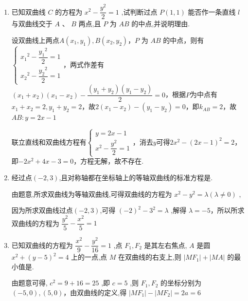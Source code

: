 \begin{enumerate}
\begin{jieda}
        代入具体数值有$100 = 36 - 64 \times (cos\angle {F}_{1}P{F}_{2} - 1)$，故$cos\angle {F}_{1}P{F}_{2} = 0$，即$\angle {F}_{1}P{F}_{2} = \dfrac{\pi}{2}$
    \end{jieda}
    \item 已知双曲线 ${C}$ 的方程为 ${x}^{2} - \dfrac{{y}^{2}}{2} = 1$ ,试判断过点 $P\left( {1,1}\right)$ 能否作一条直线 $l$ 与双曲线交于 $A\text{ 、 }B$ 两点,且 $P$ 为 ${AB}$ 的中点,并说明理由.
    \begin{jieda}
        设双曲线上两点$A(x_1, y_1), B(x_2, y_2)$，$P$ 为 ${AB}$ 的中点，则有$\left\{\begin{array}{l}
             {x_1}^{2} - \dfrac{{y_1}^{2}}{2} = 1  \\
             {x_2}^{2} - \dfrac{{y_2}^{2}}{2} = 1
        \end{array}\right.$，两式作差有$(x_1+x_2)(x_1-x_2) - \dfrac{(y_1+y_2)(y_1-y_2)}{2} = 0$，根据$P$为中点有$x_1+x_2 = 2, y_1+y_2 = 2$，故$2(x_1-x_2) - (y_1-y_2) = 0$，即$k_{AB} = 2$，故$AB: y = 2x-1$

        联立直线和双曲线方程有$\left\{\begin{array}{l}
             y = 2x-1  \\
             {x}^{2} - \dfrac{{y}^{2}}{2} = 1
        \end{array}\right.$，消去$y$可得$2x^2-(2x-1)^2 = 2$，即$-2x^2+4x-3=0$，方程无解，故不存在.
    \end{jieda}
    \item 经过点$(-2,3)$,且对称轴都在坐标轴上的等轴双曲线的标准方程是.
    \begin{jieda}
        由题意,所求双曲线为等轴双曲线,可得双曲线的方程为 ${x}^{2} - {y}^{2} = \lambda \left( {\lambda  \neq  0}\right)$ ,
        
        因为所求双曲线过点$(-2,3)$,可得 ${\left( -2\right) }^{2} - {3}^{2} = \lambda$ ,解得 $\lambda  =  - 5$，所以所求双曲线的方程为 $\dfrac{{y}^{2}}{5} - \dfrac{{x}^{2}}{5} = 1$ 
    \end{jieda}
    \item 已知双曲线的方程为 $\dfrac{{x}^{2}}{9} - \dfrac{{y}^{2}}{16} = 1$ ,点 ${F}_{1},{F}_{2}$ 是其左右焦点, ${A}$ 是圆 ${x}^{2} + {\left( y - 5\right) }^{2} = 4$ 上的一点,点 $M$ 在双曲线的右支上,则 $\left| {M{F}_{1}}\right|  + \left| {MA}\right|$ 的最小值是.
    \begin{jieda}
        由题意可得, ${c}^{2} = 9 + {16} = {25}$ ,即 $c = 5$ ,则 ${F}_{1},{F}_{2}$ 的坐标分别为 $\left( {-5,0}\right) ,\left( {5,0}\right)$，由双曲线的定义,得 $\left| {M{F}_{1}}\right|  - \left| {M{F}_{2}}\right|  = {2a} = 6$ 
        

\end{jieda}
\end{enumerate}
